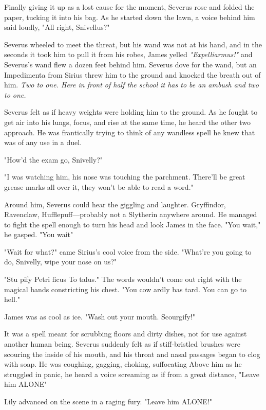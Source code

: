 Finally giving it up as a lost cause for the moment, Severus rose and folded the paper, tucking it into his bag. As he started down the lawn, a voice behind him said loudly, "All right, Snivellus?"

Severus wheeled to meet the threat, but his wand was not at his hand, and in the seconds it took him to pull it from his robes, James yelled \emph{"Expelliarmus!"} and Severus's wand flew a dozen feet behind him. Severus dove for the wand, but an Impedimenta from Sirius threw him to the ground and knocked the breath out of him. \emph{Two to one. Here in front of half the school it has to be an ambush and two to one.}

Severus felt as if heavy weights were holding him to the ground. As he fought to get air into his lungs, focus, and rise at the same time, he heard the other two approach. He was frantically trying to think of any wandless spell he knew that was of any use in a duel.

"How'd the exam go, Snivelly?"

"I was watching him, his nose was touching the parchment. There'll be great grease marks all over it, they won't be able to read a word."

Around him, Severus could hear the giggling and laughter. Gryffindor, Ravenclaw, Hufflepuff—probably not a Slytherin anywhere around. He managed to fight the spell enough to turn his head and look James in the face. "You{\el} wait," he gasped. "You{\el} wait{\el}"

"Wait for what?" came Sirius's cool voice from the side. "What're you going to do, Snivelly, wipe your nose on us?"

"Stu{\el} pify{\el} Petri{\el} ficus To{\el} talus." The words wouldn't come out right with the magical bands constricting his chest. "You cow{\el} ardly bas{\el} tard. You can{\el} go to{\el} hell."

James was as cool as ice. "Wash out your mouth. Scourgify!"

It was a spell meant for scrubbing floors and dirty dishes, not for use against another human being. Severus suddenly felt as if stiff-bristled brushes were scouring the inside of his mouth, and his throat and nasal passages began to clog with soap. He was coughing, gagging, choking, suffocating{\el} Above him as he struggled in panic, he heard a voice screaming as if from a great distance, "Leave him ALONE{\el}"

Lily advanced on the scene in a raging fury. "Leave him ALONE!"

